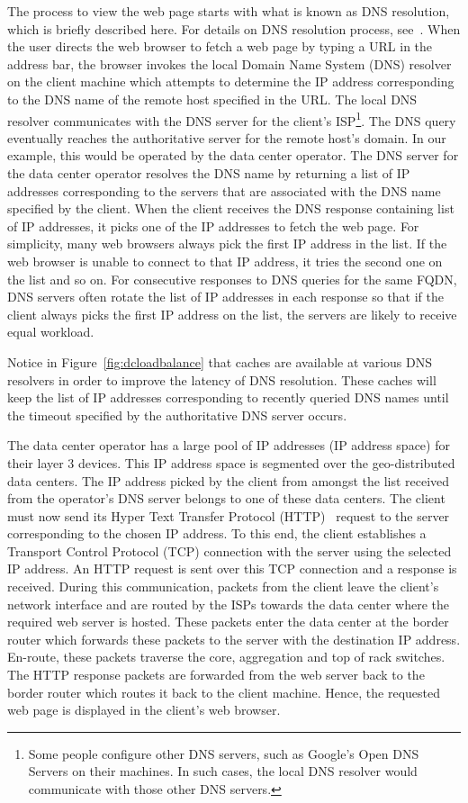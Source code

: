 The process to view the web page starts with what is known as DNS resolution, which is briefly described here. For details on DNS resolution process, see~\cite{rfc1034,rfc1035}. When the user directs the web browser to fetch a web page by typing a URL in the address bar, the browser invokes the local Domain Name System (DNS) resolver on the client machine which attempts to determine the IP address corresponding to the DNS name of the remote host specified in the URL. The local DNS resolver communicates with the DNS server for the client's ISP\footnote{Some people configure other DNS servers, such as Google's Open DNS Servers on their machines. In such cases, the local DNS resolver would communicate with those other DNS servers.}. The DNS query eventually reaches the authoritative server for the remote host's domain. In our example, this would be operated by the data center operator. The DNS server for the data center operator resolves the DNS name by returning a list of IP addresses corresponding to the servers that are associated with the DNS name specified by the client. When the client receives the DNS response containing list of IP addresses, it picks one of the IP addresses to fetch the web page. For simplicity, many web browsers always pick the first IP address in the list. If the web browser is unable to connect to that IP address, it tries the second one on the list and so on. For consecutive responses to DNS queries for the same FQDN, DNS servers often rotate the list of IP addresses in each response so that if the client always picks the first IP address on the list, the servers are likely to receive equal workload.

Notice in Figure~\ref{fig:dcloadbalance} that caches are available at various DNS resolvers in order to improve the latency of DNS resolution. These caches will keep the list of IP addresses corresponding to recently queried DNS names until the timeout specified by the authoritative DNS server occurs.

The data center operator has a large pool of IP addresses (IP address space) for their layer 3 devices. This IP address space is segmented over the geo-distributed data centers. The IP address picked by the client from amongst the list received from the operator's DNS server belongs to one of these data centers. The client must now send its Hyper Text Transfer Protocol (HTTP)~\cite{rfc1945} request to the server corresponding to the chosen IP address. To this end, the client establishes a Transport Control Protocol (TCP) connection with the server using the selected IP address. An HTTP request is sent over this TCP connection and a response is received. During this communication, packets from the client leave the client's network interface and are routed by the ISPs towards the data center where the required web server is hosted. These packets enter the data center at the border router which forwards these packets to the server with the destination IP address. En-route, these packets traverse the core, aggregation and top of rack switches. The HTTP response packets are forwarded from the web server back to the border router which routes it back to the client machine. Hence, the requested web page is displayed in the client's web browser.


